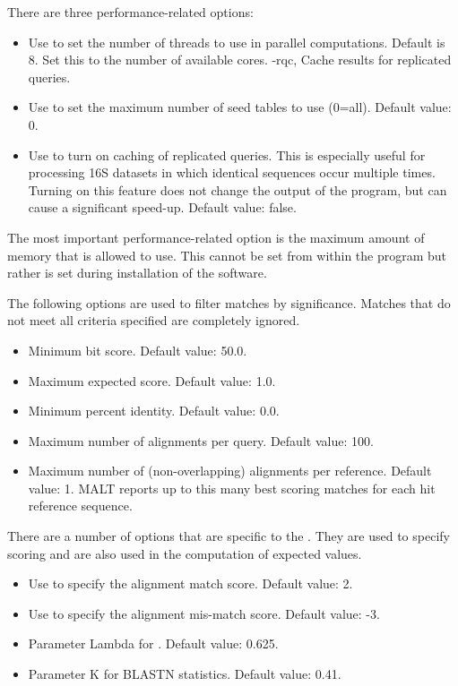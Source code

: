\documentclass[11pt]{article}
\newcommand\MALT{{\sf MALT}\xspace}
\begin{document}
There are three performance-related options:
\begin{itemize}
\setlength{\itemindent}{30pt}
\item[\itt{--threads}] Use to set the number of threads to use in parallel computations. Default is 8. Set this to
the number of available cores.
	-rqc,           Cache results for replicated queries. 
\item[\itt{--maxTables}] Use to set the maximum number of seed tables to use (0=all). Default value: 0.
\item[\itt{--replicateQueryCache}] Use to turn on caching of replicated queries. This is especially useful for processing 16S datasets
in which identical sequences occur multiple times. Turning on this feature does not change the output of the program, but can
cause a significant speed-up. Default value: false.
\end{itemize}
The most important performance-related option is the maximum amount of memory that 
is allowed to use. This cannot be set from within the program but rather is set during installation of the software.

The following options are used to filter matches by significance. Matches that do not meet all criteria specified are completely ignored.
\begin{itemize}
\setlength{\itemindent}{30pt}
\item[\itt{--minBitScore}]          Minimum bit score. Default value: 50.0.
\item[\itt{--maxExpected}]           Maximum expected score. Default value: 1.0.
\item[{\itt{--minPercentIdentity}}]  Minimum percent identity. Default value: 0.0.
\item[{\itt{--maxAlignmentsPerQuery}}]  Maximum number of alignments per query. Default value: 100.
\item[{\itt{ --maxAlignmentsPerRef}}]   Maximum number of (non-overlapping) alignments  per reference. Default value: 1.
\MALT reports up to this many best scoring matches for each hit reference sequence.
\end{itemize}

{
There are a number of options that are specific to the . They are used to specify scoring and
are also used in the computation of expected values.
\begin{itemize}
\setlength{\itemindent}{30pt}
\item[\itt{--matchScore}]            Use to specify the alignment match score. Default value: 2.
\item[\itt{--mismatchScore}]        Use to specify the alignment mis-match score. Default value: -3.
\item[\itt{--setLambda}]           Parameter Lambda  for . Default value: 0.625.
\item[\itt{--setK}]                   Parameter K  for BLASTN statistics. Default value: 0.41.
\end{itemize}
}
\end{document}

